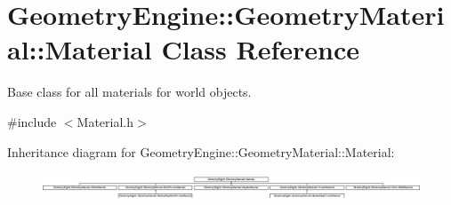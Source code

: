 \hypertarget{class_geometry_engine_1_1_geometry_material_1_1_material}{}\section{Geometry\+Engine\+::Geometry\+Material\+::Material Class Reference}
\label{class_geometry_engine_1_1_geometry_material_1_1_material}


Base class for all materials for world objects.  




{\ttfamily \#include $<$Material.\+h$>$}

Inheritance diagram for Geometry\+Engine\+::Geometry\+Material\+::Material\+:\begin{figure}[H]
\begin{center}
\leavevmode
\includegraphics[height=0.829630cm]{class_geometry_engine_1_1_geometry_material_1_1_material}
\end{center}
\end{figure}
